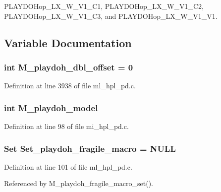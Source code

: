 PLAYDOHop\_\-LX\_\-W\_\-V1\_\-C1, PLAYDOHop\_\-LX\_\-W\_\-V1\_\-C2, PLAYDOHop\_\-LX\_\-W\_\-V1\_\-C3, and PLAYDOHop\_\-LX\_\-W\_\-V1\_\-V1.

\subsection{Variable Documentation}
\subsubsection{\setlength{\rightskip}{0pt plus 5cm}int \bf{M\_\-playdoh\_\-dbl\_\-offset} = 0}\label{ml__hpl__pd_8c_bf7fc3fb653baafe2a91de719c33d5c8}




Definition at line 3938 of file ml\_\-hpl\_\-pd.c.
\subsubsection{\setlength{\rightskip}{0pt plus 5cm}int \bf{M\_\-playdoh\_\-model}}\label{ml__hpl__pd_8c_bed36a6b8524426f321bd8de6c12bdb9}




Definition at line 98 of file mi\_\-hpl\_\-pd.c.
\subsubsection{\setlength{\rightskip}{0pt plus 5cm}\bf{Set} \bf{Set\_\-playdoh\_\-fragile\_\-macro} = \bf{NULL}}\label{ml__hpl__pd_8c_d3048f84650d62c469cf9e7075dba4b5}




Definition at line 101 of file ml\_\-hpl\_\-pd.c.

Referenced by M\_\-playdoh\_\-fragile\_\-macro\_\-set().